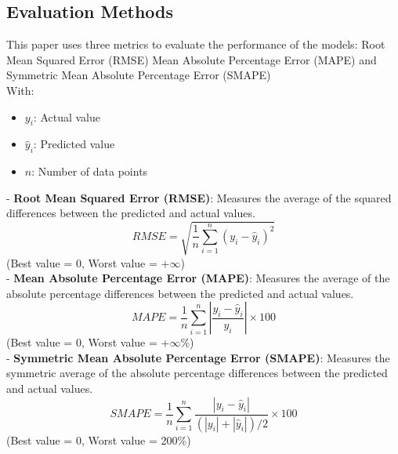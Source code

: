 \documentclass{ieeeojies}
\begin{document}
\subsection {Evaluation Methods}
This paper uses three metrics to evaluate the performance of the models: Root Mean Squared Error (RMSE) Mean Absolute Percentage Error (MAPE) and Symmetric Mean Absolute Percentage Error (SMAPE)\\
With:
\begin{itemize}
    \item \(y_i\): Actual value
    \item \(\hat{y}_i\): Predicted value
    \item \(n\): Number of data points
\end{itemize}
\noindent
- \textbf{Root Mean Squared Error (RMSE)}: Measures the average of the squared differences between the predicted and actual values.
\begin{dmath*}
    RMSE = \sqrt{\frac{1}{n} \sum_{i=1}^{n} (y_i - \hat{y}_i)^2}
\end{dmath*}
(Best value = 0, Worst value = \(+\infty\))\\
\noindent
- \textbf{Mean Absolute Percentage Error (MAPE)}: Measures the average of the absolute percentage differences between the predicted and actual values.
\begin{dmath*}
    MAPE = \frac{1}{n} \sum_{i=1}^{n} \left| \frac{y_i - \hat{y}_i}{y_i} \right| \times 100
\end{dmath*}
(Best value = 0, Worst value = \(+\infty\%\))\\
\noindent
- \textbf{Symmetric Mean Absolute Percentage Error (SMAPE)}: Measures the symmetric average of the absolute percentage differences between the predicted and actual values.
\begin{dmath*}
    SMAPE = \frac{1}{n} \sum_{i=1}^{n} \frac{\left| y_i - \hat{y}_i \right|}{\left( \left| y_i \right| + \left| \hat{y}_i \right| \right)/2} \times 100
\end{dmath*}
(Best value = 0, Worst value = 200\%)\\
\end{document}
